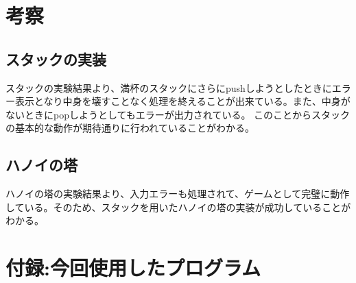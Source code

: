 \documentclass[dvipdfmx]{jsarticle}
\begin{document}

\section{考察}
\subsection{スタックの実装}
スタックの実験結果より、満杯のスタックにさらにpushしようとしたときにエラー表示となり中身を壊すことなく処理を終えることが出来ている。また、中身がないときにpopしようとしてもエラーが出力されている。
このことからスタックの基本的な動作が期待通りに行われていることがわかる。
\subsection{ハノイの塔}
ハノイの塔の実験結果より、入力エラーも処理されて、ゲームとして完璧に動作している。そのため、スタックを用いたハノイの塔の実装が成功していることがわかる。

\section{付録:今回使用したプログラム}


\end{document}
